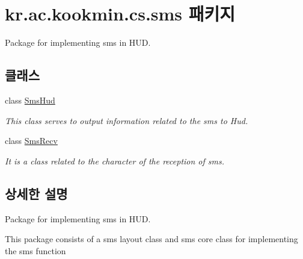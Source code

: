 \hypertarget{namespacekr_1_1ac_1_1kookmin_1_1cs_1_1sms}{}\section{kr.\+ac.\+kookmin.\+cs.\+sms 패키지}
\label{namespacekr_1_1ac_1_1kookmin_1_1cs_1_1sms}


Package for implementing sms in H\+U\+D.  


\subsection*{클래스}
\begin{DoxyCompactItemize}
\item 
class \hyperlink{classkr_1_1ac_1_1kookmin_1_1cs_1_1sms_1_1_sms_hud}{Sms\+Hud}
\begin{DoxyCompactList}\small\item\em This class serves to output information related to the sms to Hud. \end{DoxyCompactList}\item 
class \hyperlink{classkr_1_1ac_1_1kookmin_1_1cs_1_1sms_1_1_sms_recv}{Sms\+Recv}
\begin{DoxyCompactList}\small\item\em It is a class related to the character of the reception of sms. \end{DoxyCompactList}\end{DoxyCompactItemize}


\subsection{상세한 설명}
Package for implementing sms in H\+U\+D. 

This package consists of a sms layout class and sms core class for implementing the sms function 